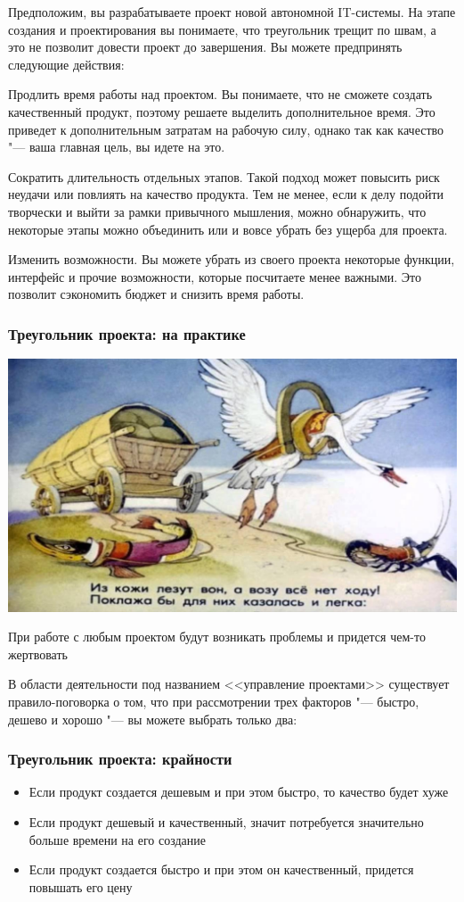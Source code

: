\documentclass{../industrial-development}
\begin{document}
Предположим, вы разрабатываете проект новой автономной IT-системы. На этапе создания и проектирования вы понимаете, что треугольник трещит по швам, а это не позволит довести проект до завершения. Вы можете предпринять следующие действия:

Продлить время работы над проектом. Вы понимаете, что не сможете создать качественный продукт, поэтому решаете выделить дополнительное время. Это приведет к дополнительным затратам на рабочую силу, однако так как качество "--- ваша главная цель, вы идете на это.

Сократить длительность отдельных этапов. Такой подход может повысить риск неудачи или повлиять на качество продукта. Тем не менее, если к делу подойти творчески и выйти за рамки привычного мышления, можно обнаружить, что некоторые этапы можно объединить или и вовсе убрать без ущерба для проекта.

Изменить возможности. Вы можете убрать из своего проекта некоторые функции, интерфейс и прочие возможности, которые посчитаете менее важными. Это позволит сэкономить бюджет и снизить время работы.


    \begin{frame} \frametitle{Треугольник проекта: на практике}
         \centerline{\includegraphics[width=1\textwidth]{start.jpg}}
    \end{frame}
    \lecturenotes

При работе с любым проектом будут возникать проблемы и придется чем-то жертвовать

В области деятельности под названием <<управление проектами>> существует правило-поговорка о том, что при рассмотрении трех факторов "--- быстро, дешево и хорошо "--- вы можете выбрать только два:

    \begin{frame} \frametitle{Треугольник проекта: крайности}
	\begin{itemize}
		\item Если продукт создается дешевым и при этом быстро, то качество будет хуже
		\item Если продукт дешевый и качественный, значит потребуется значительно больше времени на его создание
		\item Если продукт создается быстро и при этом он качественный, придется повышать его цену
	\end{itemize}
    \end{frame}
    \lecturenotes
\end{document}
